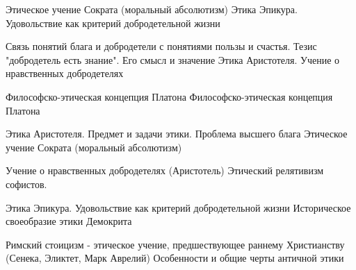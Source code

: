 \documentclass[
	14pt,
	a4paper,
	]
	{scrartcl}
\begin{document}
\vfill

\newpage


\shapk
{}
\setcounter{zad}{0}

\vfill
\z Этическое учение Сократа (моральный абсолютизм)
 \vfill
\z Этика Эпикура. Удовольствие как критерий добродетельной жизни
 \vfill

\vfill

\newpage


\shapk
{}
\setcounter{zad}{0}

\vfill
\z Связь понятий блага и добродетели с понятиями пользы и счастья. Тезис "добродетель есть знание". Его смысл и значение
 \vfill
\z Этика Аристотеля. Учение о нравственных добродетелях
 \vfill

\vfill

\newpage


\shapk
{}
\setcounter{zad}{0}

\vfill
\z Философско-этическая концепция Платона
 \vfill
\z Философско-этическая концепция Платона
 \vfill

\vfill

\newpage


\shapk
{}
\setcounter{zad}{0}

\vfill
\z Этика Аристотеля. Предмет и задачи этики. Проблема высшего блага
 \vfill
\z Этическое учение Сократа (моральный абсолютизм)
 \vfill

\vfill

\newpage


\shapk
{}
\setcounter{zad}{0}

\vfill
\z Учение о нравственных добродетелях (Аристотель)
 \vfill
\z Этический релятивизм софистов.
 \vfill

\vfill

\newpage


\shapk
{}
\setcounter{zad}{0}

\vfill
\z Этика Эпикура. Удовольствие как критерий добродетельной жизни
 \vfill
\z Историческое своеобразие этики Демокрита
 \vfill

\vfill

\newpage


\shapk
{}
\setcounter{zad}{0}

\vfill
\z Римский стоицизм - этическое учение, предшествующее раннему Христианству (Сенека, Эликтет, Марк Аврелий)
 \vfill
\z Особенности и общие черты античной этики
 \vfill
\end{document}
